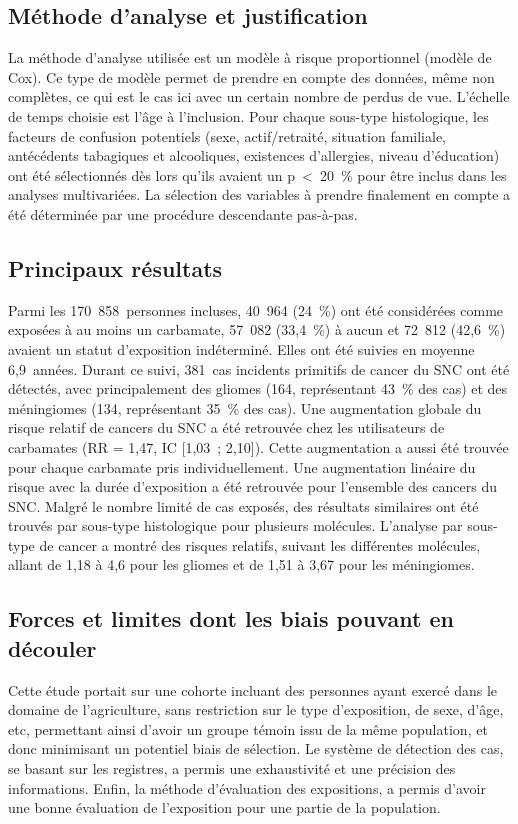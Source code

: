 \documentclass[10pt,english,french]{article}
\begin{document}
\subsection{Méthode d'analyse et justification}
La méthode d'analyse utilisée est un modèle à risque proportionnel (modèle de Cox). Ce type de modèle permet de prendre en compte des données, même non complètes, ce qui est le cas ici avec un certain nombre de perdus de vue. L'échelle de temps choisie est l'âge à l'inclusion. Pour chaque sous-type histologique, les facteurs de confusion potentiels (sexe, actif/retraité, situation familiale, antécédents tabagiques et alcooliques, existences d'allergies, niveau d'éducation) ont été sélectionnés dès lors qu'ils avaient un p~<~20~\% pour être inclus dans les analyses multivariées. La sélection des variables à prendre finalement en compte a été déterminée par une procédure descendante pas-à-pas.

\subsection{Principaux résultats}
Parmi les 170~858~personnes incluses, 40~964 (24~\%) ont été considérées comme exposées à au moins un carbamate, 57~082 (33,4~\%) à aucun et 72~812 (42,6~\%) avaient un statut d'exposition indéterminé. Elles ont été suivies en moyenne 6,9~années. Durant ce suivi, 381~cas incidents primitifs de cancer du SNC ont été détectés, avec principalement des gliomes (164, représentant 43~\% des cas) et des méningiomes (134, représentant 35~\% des cas). Une augmentation globale du risque relatif de cancers du SNC a été retrouvée chez les utilisateurs de carbamates (RR = 1,47, IC [1,03~; 2,10]). Cette augmentation a aussi été trouvée pour chaque carbamate pris individuellement. Une augmentation linéaire du risque avec la durée d'exposition a été retrouvée pour l'ensemble des cancers du SNC. Malgré le nombre limité de cas exposés, des résultats similaires ont été trouvés par sous-type histologique pour plusieurs molécules. L'analyse par sous-type de cancer a montré des risques relatifs, suivant les différentes molécules, allant de 1,18 à 4,6 pour les gliomes et de 1,51 à 3,67 pour les méningiomes.

\subsection{Forces et limites dont les biais pouvant en découler}
Cette étude portait sur une cohorte incluant des personnes ayant exercé dans le domaine de l'agriculture, sans restriction sur le type d'exposition, de sexe, d'âge, etc, permettant ainsi d'avoir un groupe témoin issu de la même population, et donc minimisant un potentiel biais de sélection. Le système de détection des cas, se basant sur les registres, a permis une exhaustivité et une précision des informations. Enfin, la méthode d'évaluation des expositions, a permis d'avoir une bonne évaluation de l'exposition pour une partie de la population.
\end{document}
